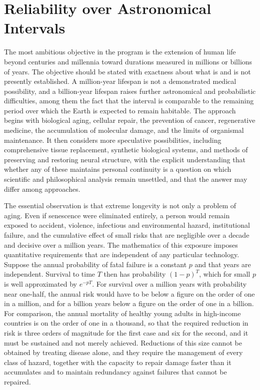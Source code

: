 \chapter{Reliability over Astronomical Intervals}
\label{ch:29}

The most ambitious objective in the program is the extension of human life beyond centuries and millennia toward durations measured in millions or billions of years. The objective should be stated with exactness about what is and is not presently established. A million-year lifespan is not a demonstrated medical possibility, and a billion-year lifespan raises further astronomical and probabilistic difficulties, among them the fact that the interval is comparable to the remaining period over which the Earth is expected to remain habitable. The approach begins with biological aging, cellular repair, the prevention of cancer, regenerative medicine, the accumulation of molecular damage, and the limits of organismal maintenance. It then considers more speculative possibilities, including comprehensive tissue replacement, synthetic biological systems, and methods of preserving and restoring neural structure, with the explicit understanding that whether any of these maintains personal continuity is a question on which scientific and philosophical analysis remain unsettled, and that the answer may differ among approaches.

The essential observation is that extreme longevity is not only a problem of aging. Even if senescence were eliminated entirely, a person would remain exposed to accident, violence, infectious and environmental hazard, institutional failure, and the cumulative effect of small risks that are negligible over a decade and decisive over a million years. The mathematics of this exposure imposes quantitative requirements that are independent of any particular technology. Suppose the annual probability of fatal failure is a constant $p$ and that years are independent. Survival to time $T$ then has probability $(1-p)^T$, which for small $p$ is well approximated by $e^{-pT}$. For survival over a million years with probability near one-half, the annual risk would have to be below a figure on the order of one in a million, and for a billion years below a figure on the order of one in a billion. For comparison, the annual mortality of healthy young adults in high-income countries is on the order of one in a thousand, so that the required reduction in risk is three orders of magnitude for the first case and six for the second, and it must be sustained and not merely achieved. Reductions of this size cannot be obtained by treating disease alone, and they require the management of every class of hazard, together with the capacity to repair damage faster than it accumulates and to maintain redundancy against failures that cannot be repaired.

